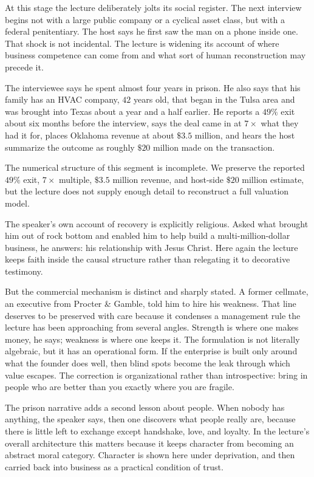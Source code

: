 At this stage the lecture deliberately jolts its social register. The next interview begins not with a large public company or a cyclical asset class, but with a federal penitentiary. The host says he first saw the man on a phone inside one. That shock is not incidental. The lecture is widening its account of where business competence can come from and what sort of human reconstruction may precede it.

The interviewee says he spent almost four years in prison. He also says that his family has an HVAC company, \(42\) years old, that began in the Tulsa area and was brought into Texas about a year and a half earlier. He reports a \(49\%\) exit about six months before the interview, says the deal came in at \(7\times\) what they had it for, places Oklahoma revenue at about \(\$3.5\) million, and hears the host summarize the outcome as roughly \(\$20\) million made on the transaction.

\begin{remark}
The numerical structure of this segment is incomplete. We preserve the reported \(49\%\) exit, \(7\times\) multiple, \(\$3.5\) million revenue, and host-side \(\$20\) million estimate, but the lecture does not supply enough detail to reconstruct a full valuation model.
\end{remark}

The speaker's own account of recovery is explicitly religious. Asked what brought him out of rock bottom and enabled him to help build a multi-million-dollar business, he answers: his relationship with Jesus Christ. Here again the lecture keeps faith inside the causal structure rather than relegating it to decorative testimony.

But the commercial mechanism is distinct and sharply stated. A former cellmate, an executive from Procter \& Gamble, told him to hire his weakness. That line deserves to be preserved with care because it condenses a management rule the lecture has been approaching from several angles. Strength is where one makes money, he says; weakness is where one keeps it. The formulation is not literally algebraic, but it has an operational form. If the enterprise is built only around what the founder does well, then blind spots become the leak through which value escapes. The correction is organizational rather than introspective: bring in people who are better than you exactly where you are fragile.

The prison narrative adds a second lesson about people. When nobody has anything, the speaker says, then one discovers what people really are, because there is little left to exchange except handshake, love, and loyalty. In the lecture's overall architecture this matters because it keeps character from becoming an abstract moral category. Character is shown here under deprivation, and then carried back into business as a practical condition of trust.

